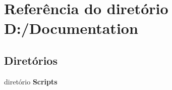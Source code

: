 \section{Referência do diretório D\+:/\+Documentation}
\label{dir_689a040f4fd63ebd4200c92cefe6b6f2}
\subsection*{Diretórios}
\begin{DoxyCompactItemize}
\item 
diretório \textbf{ Scripts}
\end{DoxyCompactItemize}
